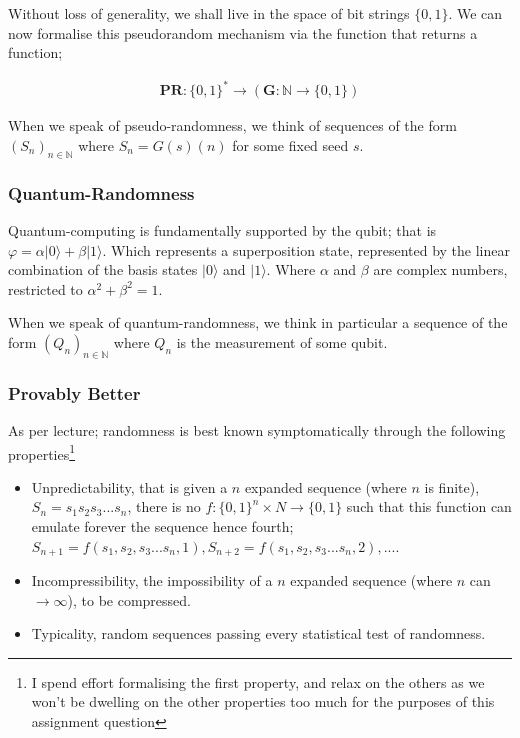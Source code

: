 \documentclass{article}
\begin{document}
Without loss of generality, we shall live in the space of bit strings $\{0, 1\}$. We can now formalise this pseudorandom mechanism via the function that returns a function;

\begin{align*}
	\bm{PR}: \{0,1\}^* \rightarrow (\bm{G}: \mathbb{N} \rightarrow \{0,1\})
\end{align*}

When we speak of pseudo-randomness, we think of sequences of the form $(S_n)_{n \in \mathbb{N}}$ where $S_n = G(s)(n)$ for some fixed seed $s$.

\subsubsection*{Quantum-Randomness}
Quantum-computing is fundamentally supported by the qubit; that is $\varphi = \alpha | 0\rangle + \beta | 1\rangle$. Which represents a superposition state, represented by the linear combination of the basis states $| 0\rangle$ and $| 1\rangle$. Where $\alpha$ and $\beta$ are complex numbers, restricted to $\alpha^2 + \beta^2 = 1$. 

When we speak of quantum-randomness, we think in particular a sequence of the form $(Q_n)_{n \in \mathbb{N}}$ where $Q_n$ is the measurement of some qubit.

\subsubsection*{Provably Better}
As per lecture; randomness is best known symptomatically through the following properties\footnote{I spend effort formalising the first property, and relax on the others as we won't be dwelling on the other properties too much for the purposes of this assignment question}

\begin{itemize}
	\item Unpredictability, that is given a $n$ expanded sequence (where $n$ is finite), $S_n=s_1s_2s_3...s_n$, there is no $f: \{0,1\}^n \times N \rightarrow \{0,1\}$ such that this function can emulate forever the sequence hence fourth; $S_{n+1} = f(s_1,s_2,s_3...s_n, 1), S_{n+2} = f(s_1,s_2,s_3...s_n, 2), ...$.
	\item Incompressibility, the impossibility of a $n$ expanded sequence (where $n$ can $\rightarrow \infty$), to be compressed.
	\item Typicality, random sequences passing every statistical test of randomness.
\end{itemize}
\end{document}
